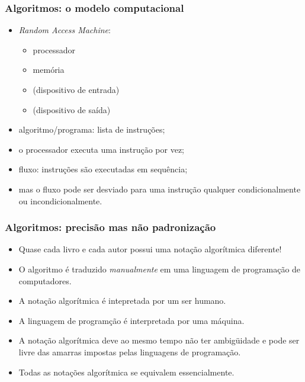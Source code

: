 \documentclass{beamer}
\begin{document}
\begin{frame}

  \frametitle{Algoritmos: o modelo computacional}

  \begin{itemize}
  \item \textit{Random Access Machine}: 
    \begin{itemize}
      \item processador
      \item memória
      \item (dispositivo de entrada)
      \item (dispositivo de saída)
    \end{itemize}
  \item algoritmo/programa: lista de instruções;
  \item o processador executa uma instrução por vez;
  \item fluxo: instruções são executadas em sequência;
  \item mas o fluxo pode ser desviado para uma instrução qualquer
    condicionalmente ou incondicionalmente.
  \end{itemize}
\end{frame}

\begin{frame}

  \frametitle{Algoritmos: precisão mas não padronização}

  \begin{itemize}
  \item Quase cada livro e cada autor possui uma notação algorítmica diferente!

  \item O algoritmo é traduzido \emph{manualmente} em uma linguagem de
    programação de computadores.

  \item A notação algorítmica é intepretada por um ser humano.

  \item A linguagem de programção é interpretada por uma máquina.

  \item A notação algorítmica deve ao mesmo tempo não ter ambigüidade e pode ser
    livre das amarras impostas pelas linguagens de programação.

  \item Todas as notações algorítmica se equivalem essencialmente.

  \end{itemize}

\end{frame}
\end{document}
